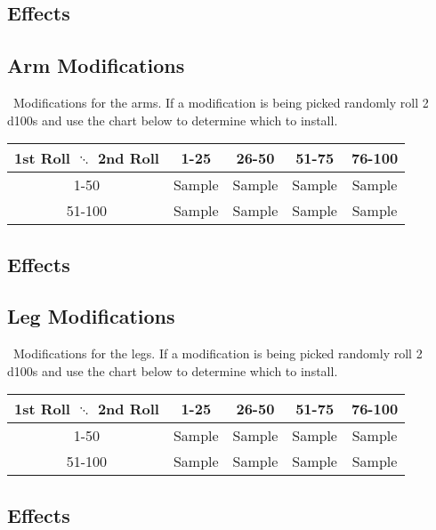 \subsection*{Effects}
\begin{multicols}{2}
\end{multicols}
\clearpage

\subsection{Arm Modifications}
\magit\ Modifications for the arms. If a modification is being picked randomly roll 2 d100s and use the chart below to determine which to install.
\begin{center}
\begin{tabular}{c | c | c | c | c}
1st Roll $\ddots$ 2nd Roll & 1-25 & 26-50 & 51-75 & 76-100 \\
\hline
1-50 & Sample & Sample & Sample & Sample\\
\hline
51-100 & Sample & Sample & Sample & Sample\\
\end{tabular}
\end{center}
\subsection*{Effects}
\begin{multicols}{2}
\end{multicols}
\clearpage

\subsection{Leg Modifications}
\magit\ Modifications for the legs. If a modification is being picked randomly roll 2 d100s and use the chart below to determine which to install.
\begin{center}
\begin{tabular}{c | c | c | c | c}
1st Roll $\ddots$ 2nd Roll & 1-25 & 26-50 & 51-75 & 76-100 \\
\hline
1-50 & Sample & Sample & Sample & Sample\\
\hline
51-100 & Sample & Sample & Sample & Sample\\
\end{tabular}
\end{center}
\subsection*{Effects}
\begin{multicols}{2}
\end{multicols}
\clearpage

